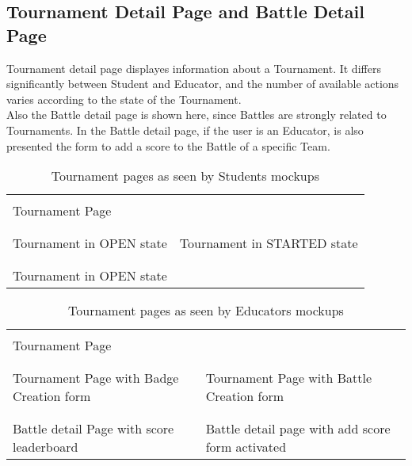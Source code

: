\subsection{Tournament Detail Page and Battle Detail Page}
Tournament detail page displayes information about a Tournament. It differs significantly between Student and Educator, and the number of available actions varies according to the state of the Tournament.\\
Also the Battle detail page is shown here, since Battles are strongly related to Tournaments. In the Battle detail page, if the user is an Educator, is also presented the form to add a score to the Battle of a specific Team.\\
\clearpage
\begin{table}
    \begin{tabu}{X[c, .5] X[c, .5]} 
         & \\
        Tournament Page & \\
        & \\
         &  \\
        Tournament in OPEN state & Tournament in STARTED state \\
        & \\
         & \\
        Tournament in OPEN state & \\
    \end{tabu}
    \caption{Tournament pages as seen by Students mockups}
\end{table}
\begin{table}
    \begin{tabu}{X[c, .5] X[c, .5]} 
         &  \\
        Tournament Page & \\
        & \\
         &  \\
        Tournament Page with Badge Creation form & Tournament Page with Battle Creation form\\
        & \\
         &  \\
        Battle detail Page with score leaderboard & Battle detail page with add score form activated\\
    \end{tabu}
    \caption{Tournament pages as seen by Educators mockups}
\end{table}
\clearpage
